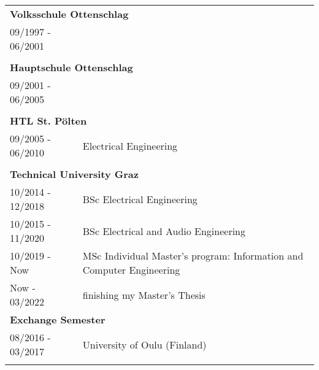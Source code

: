 

\\\\
\begin{tabular} { l p{3.9cm} }
  

  \multicolumn{2}{l}{\textbf{Volksschule Ottenschlag}}\\
  \small{09/1997 - 06/2001}\\\\
  
  \multicolumn{2}{l}{\textbf{Hauptschule Ottenschlag}}\\
  \small{09/2001 - 06/2005}\\\\

  \multicolumn{2}{l}{\textbf{HTL St. Pölten}}\\
  \small{09/2005 - 06/2010} &  Electrical Engineering\\\\

  \multicolumn{2}{l}{\textbf{Technical University Graz}}\\
  \small{10/2014 - 12/2018} & BSc Electrical Engineering\\
  \small{10/2015 - 11/2020} & BSc Electrical and Audio Engineering\\
  \small{10/2019 - Now} & MSc Individual Master's program: Information and Computer Engineering\\
  \small{Now - 03/2022} & finishing my Master's Thesis\\

  \multicolumn{2}{l}{\textbf{Exchange Semester}}\\
  \small{08/2016 - 03/2017} & University of Oulu (Finland)\\\\

\end{tabular}
